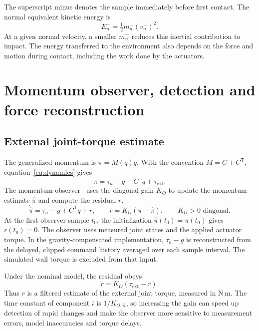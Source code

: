 \documentclass[11pt,a4paper]{article}
\newcommand{\ms}{m_n^-}
\newcommand{\vs}{v_n^-}
\begin{document}
The superscript minus denotes the sample immediately before first contact.
The normal equivalent kinetic energy is
\begin{equation}
 E_n^-=\tfrac12\ms(\vs)^2 .
 \label{eq:entry-energy}
\end{equation}
At a given normal velocity, a smaller $\ms$ reduces this inertial contribution
to impact.
The energy transferred to the environment also depends on the force and
motion during contact, including the work done by the actuators.

\section{Momentum observer, detection and force reconstruction}
\subsection{External joint-torque estimate}
The generalized momentum is $\pi=M(q)\dot q$. With the convention
$\dot M=C+C^{\mathsf T}$, equation~\eqref{eq:dynamics} gives
\begin{equation}
 \dot\pi=\tau_a-g+C^{\mathsf T}\dot q+\tau_{\mathrm{ext}}.
\end{equation}
The momentum observer~\cite{deluca2005,haddadin2017} uses the diagonal gain
$K_O$ to update the momentum estimate $\widehat\pi$ and compute the residual $r$.
\begin{equation}
 \dot{\widehat\pi}=\tau_a-g+C^{\mathsf T}\dot q+r,
 \qquad r=K_O(\pi-\widehat\pi),\qquad K_O>0\text{ diagonal}.
 \label{eq:observer}
\end{equation}
At the first observer sample $t_0$, the initialization
$\widehat\pi(t_0)=\pi(t_0)$ gives $r(t_0)=0$.
The observer uses measured joint states and the applied actuator torque.
In the gravity-compensated implementation, $\tau_a-g$ is reconstructed
from the delayed, clipped command history averaged over each sample interval.
The simulated wall torque is excluded from that input.

Under the nominal model, the residual obeys
\begin{equation}
 \dot r=K_O(\tau_{\mathrm{ext}}-r).
 \label{eq:residual-filter}
\end{equation}
Thus $r$ is a filtered estimate of the external joint torque, measured in
N\,m. The time constant of component $i$ is $1/K_{O,ii}$, so increasing the
gain can speed up detection of rapid changes and make the observer more
sensitive to measurement errors, model inaccuracies and torque delays.
\end{document}
